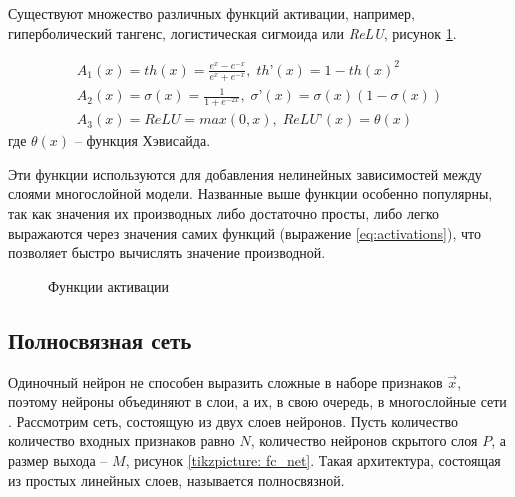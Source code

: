 \indent
\indent
Существуют множество различных функций активации, например, гиперболический
тангенс, логистическая сигмоида или \textit{ReLU}, рисунок \ref{tikzpicture: activations}.

\begin{equation}\label{eq:activations}
	\begin{gathered}
	    A_{1}(x) = th(x) = \frac{e^x - e^{-x}}{e^x + e^{-x}},    \;   th’(x) = {1 - th(x)^2}  \\    
	    A_{2}(x) = \sigma(x) = \frac{1}{1 + e^{-2x}},   \;   \sigma’(x) = \sigma(x)(1 - \sigma(x)) \\
	    A_{3}(x) = ReLU = max(0, x),   \;   ReLU’(x) = \theta(x)
	\end{gathered}
\end{equation}
где $\theta(x)$ -- функция Хэвисайда.

\indent
\indent
Эти функции используются
для добавления нелинейных зависимостей между слоями многослойной модели.
Названные выше функции особенно популярны, 
так как значения их производных либо достаточно просты, либо легко 
выражаются через значения самих функций (выражение \ref{eq:activations}), 
что позволяет быстро вычислять значение производной.

\begin{figure}[h!]
	\begin{center}
	\end{center}
\caption{Функции активации}
\label{tikzpicture: activations}
\end{figure}

\subsection{Полносвязная сеть}

\indent
\indent
Одиночный нейрон не способен выразить сложные в наборе
признаков $\vec{x}$, поэтому нейроны объединяют в слои, а их, в свою 
очередь, в многослойные сети . Рассмотрим сеть,
состоящую из двух слоев нейронов. Пусть количество количество входных признаков
равно $N$, количество нейронов скрытого слоя $P$,
а размер выхода -- $M$, рисунок \ref{tikzpicture: fc_net}. Такая архитектура, 
состоящая из простых линейных слоев, называется полносвязной.
 
